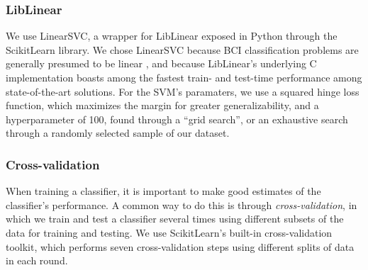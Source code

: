\subsubsection{LibLinear}
We use LinearSVC, \cite{fan_liblinear:_2008} a wrapper for LibLinear exposed in Python through the ScikitLearn library. \cite{pedregosa_scikit-learn:_2011} We chose LinearSVC because BCI classification problems are generally presumed to be linear  \cite{garrett_comparison_2003,lotte_review_2007}, and because LibLinear's underlying C implementation boasts among the fastest train- and test-time performance among state-of-the-art solutions. \cite{fan_liblinear:_2008} For the SVM's paramaters, we use a squared hinge loss function, which maximizes the margin for greater generalizability, and a hyperparameter of 100, found through a ``grid search'', or an exhaustive search through a randomly selected sample of our dataset. 

\subsubsection{Cross-validation}

When training a classifier, it is important to make good estimates of the classifier's performance. A common way to do this is through \textit{cross-validation}, in which we train and test a classifier several times using different subsets of the data for training and testing. We use ScikitLearn's built-in cross-validation toolkit, which performs seven cross-validation steps using different splits of data in each round.
